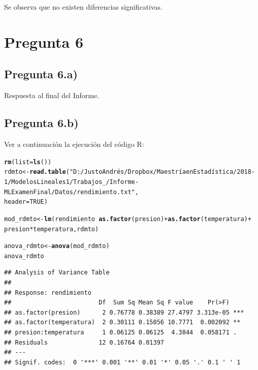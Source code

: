 \documentclass[10pt,a4paper]{article}\usepackage[]{graphicx}\usepackage[]{color}
\makeatletter
\newcommand{\hlnum}[1]{\textcolor[rgb]{0.686,0.059,0.569}{#1}}%
\newcommand{\hlstr}[1]{\textcolor[rgb]{0.192,0.494,0.8}{#1}}%
\newcommand{\hlopt}[1]{\textcolor[rgb]{0,0,0}{#1}}%
\newcommand{\hlstd}[1]{\textcolor[rgb]{0.345,0.345,0.345}{#1}}%
\newcommand{\hlkwb}[1]{\textcolor[rgb]{0.69,0.353,0.396}{#1}}%
\newcommand{\hlkwc}[1]{\textcolor[rgb]{0.333,0.667,0.333}{#1}}%
\newcommand{\hlkwd}[1]{\textcolor[rgb]{0.737,0.353,0.396}{\textbf{#1}}}%
\newenvironment{kframe}{%
 \def\at@end@of@kframe{}%
 \ifinner\ifhmode%
  \def\at@end@of@kframe{\end{minipage}}%
  \begin{minipage}{\columnwidth}%
 \fi\fi%
 \def\FrameCommand##1{\hskip\@totalleftmargin \hskip-\fboxsep
 \colorbox{shadecolor}{##1}\hskip-\fboxsep
     \hskip-\linewidth \hskip-\@totalleftmargin \hskip\columnwidth}%
 \MakeFramed {\advance\hsize-\width
   \@totalleftmargin\z@ \linewidth\hsize
   \@setminipage}}%
 {\par\unskip\endMakeFramed%
 \at@end@of@kframe}
\newenvironment{knitrout}{}{} %
\makeatother
\begin{document}
Se observa que no existen diferencias significativas. 

\section{Pregunta 6}

\subsection{Pregunta 6.a)}

Respuesta al final del Informe.

\subsection{Pregunta 6.b)}

Ver a continuación la ejecución del código R:

\begin{knitrout}\small
{}\color{fgcolor}\begin{kframe}
\begin{alltt}
\hlkwd{rm}\hlstd{(}\hlkwc{list} \hlstd{=} \hlkwd{ls}\hlstd{())}
\hlstd{rdmto} \hlkwb{<-} \hlkwd{read.table}\hlstd{(}\hlstr{"D:/Justo Andrés/Dropbox/Maestría en Estadística/2018 - 1/Modelos Lineales 1/Trabajos_/Informe - ML Examen Final/Datos/rendimiento.txt"}\hlstd{,}
    \hlkwc{header} \hlstd{=} \hlnum{TRUE}\hlstd{)}

\hlstd{mod_rdmto} \hlkwb{<-} \hlkwd{lm}\hlstd{(rendimiento} \hlopt{~} \hlkwd{as.factor}\hlstd{(presion)} \hlopt{+} \hlkwd{as.factor}\hlstd{(temperatura)} \hlopt{+}
    \hlstd{presion} \hlopt{*} \hlstd{temperatura, rdmto)}

\hlstd{anova_rdmto} \hlkwb{<-} \hlkwd{anova}\hlstd{(mod_rdmto)}
\hlstd{anova_rdmto}
\end{alltt}
\begin{verbatim}
## Analysis of Variance Table
## 
## Response: rendimiento
##                        Df  Sum Sq Mean Sq F value    Pr(>F)    
## as.factor(presion)      2 0.76778 0.38389 27.4797 3.313e-05 ***
## as.factor(temperatura)  2 0.30111 0.15056 10.7771  0.002092 ** 
## presion:temperatura     1 0.06125 0.06125  4.3844  0.058171 .  
## Residuals              12 0.16764 0.01397                      
## ---
## Signif. codes:  0 '***' 0.001 '**' 0.01 '*' 0.05 '.' 0.1 ' ' 1
\end{verbatim}
\end{kframe}
\end{knitrout}
\end{document}
